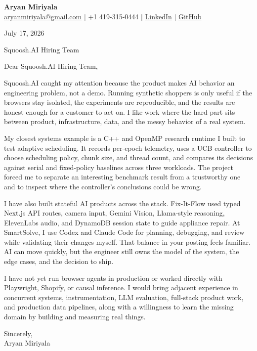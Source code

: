 \documentclass[letterpaper,11pt]{article}
\begin{document}
{\Large\textbf{Aryan Miriyala}}\\
\href{mailto:aryanmiriyala@gmail.com}{aryanmiriyala@gmail.com} $|$ +1 419-315-0444 $|$
\href{https://www.linkedin.com/in/aryan-miriyala-7788a21b6/}{LinkedIn} $|$
\href{https://github.com/aryanmiriyala}{GitHub}

July 17, 2026

Squoosh.AI Hiring Team

Dear Squoosh.AI Hiring Team,

Squoosh.AI caught my attention because the product makes AI behavior an engineering problem, not a demo. Running synthetic shoppers is only useful if the browsers stay isolated, the experiments are reproducible, and the results are honest enough for a customer to act on. I like work where the hard part sits between product, infrastructure, data, and the messy behavior of a real system.

My closest systems example is a C++ and OpenMP research runtime I built to test adaptive scheduling. It records per-epoch telemetry, uses a UCB controller to choose scheduling policy, chunk size, and thread count, and compares its decisions against serial and fixed-policy baselines across three workloads. The project forced me to separate an interesting benchmark result from a trustworthy one and to inspect where the controller's conclusions could be wrong.

I have also built stateful AI products across the stack. Fix-It-Flow used typed Next.js API routes, camera input, Gemini Vision, Llama-style reasoning, ElevenLabs audio, and DynamoDB session state to guide appliance repair. At SmartSolve, I use Codex and Claude Code for planning, debugging, and review while validating their changes myself. That balance in your posting feels familiar. AI can move quickly, but the engineer still owns the model of the system, the edge cases, and the decision to ship.

I have not yet run browser agents in production or worked directly with Playwright, Shopify, or causal inference. I would bring adjacent experience in concurrent systems, instrumentation, LLM evaluation, full-stack product work, and production data pipelines, along with a willingness to learn the missing domain by building and measuring real things.

Sincerely,\\
Aryan Miriyala
\end{document}
